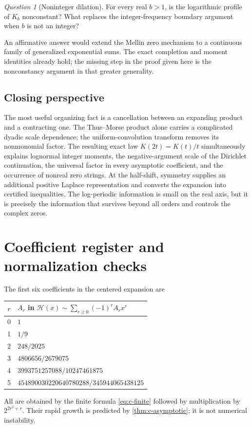 \documentclass[11pt,a4paper]{article}
\numberwithin{equation}{section}
\theoremstyle{definition}
\theoremstyle{remark}
\newtheorem{question}[question]{Question}
\newcommand{\calH}{\mathcal H}
\begin{document}
\begin{question}[Noninteger dilation]
For every real $b>1$, is the logarithmic profile of $K_b$ nonconstant?
What replaces the integer-frequency boundary argument when $b$ is
not an integer?
\end{question}
An affirmative answer would extend the Mellin zero mechanism to a
continuous family of generalized exponential sums. The exact
completion and moment identities already hold; the missing step in
the proof given here is the nonconstancy argument in that greater
generality.

\subsection*{Closing perspective}
The most useful organizing fact is a cancellation between an
expanding product and a contracting one. The Thue--Morse product
alone carries a complicated dyadic scale dependence; the
uniform-convolution transform removes its nonmonomial factor.
The resulting exact law $K(2t)=K(t)/t$ simultaneously explains
lognormal integer moments, the negative-argument scale of the
Dirichlet continuation, the universal factor in every asymptotic
coefficient, and the occurrence of nonreal zero strings.
At the half-shift, symmetry supplies an additional positive
Laplace representation and converts the expansion into certified
inequalities. The log-periodic information is small on the real
axis, but it is precisely the information that survives beyond all
orders and controls the complex zeros.

\appendix
\section{Coefficient register and normalization checks}
\label{app:coefficients}
The first six coefficients in the centered expansion are
\begin{center}\small
\begin{tabular}{@{}cl@{}}
\toprule
$r$&$A_r$ in $\calH(x)\sim\sum_{r\ge0}(-1)^rA_rx^r$\\
\midrule
0&$1$\\[2pt]
1&$1/9$\\[2pt]
2&$248/2025$\\[2pt]
3&$4806656/2679075$\\[2pt]
4&$3993751257088/10247461875$\\[2pt]
5&$454890030220640780288/345944065438125$\\
\bottomrule
\end{tabular}
\end{center}
All are obtained by the finite formula \cref{eq:c-finite} followed
by multiplication by $2^{2r^2+r}$. Their rapid growth is predicted
by \cref{thm:c-asymptotic}; it is not numerical instability.
\end{document}
